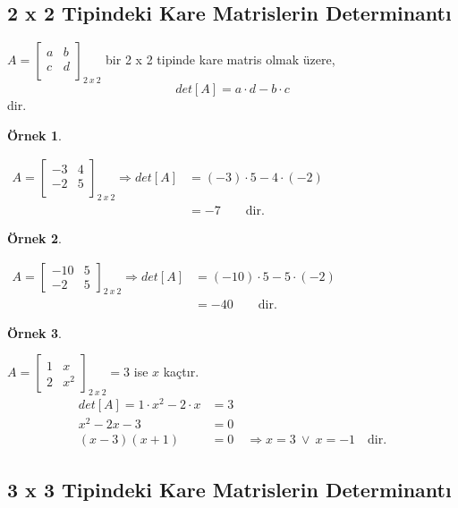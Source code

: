 \documentclass[a4paper,10pt]{book}
\theoremstyle{italik}
\newtheorem{ornek}{Örnek}[chapter]
\begin{document}
\subsection{2 x 2 Tipindeki Kare Matrislerin Determinantı}
$
A=\left[\begin{array}{cccc}
	a & b  \\
	c & d \\
\end{array}\right]_{2\ x\ 2}
$
bir 2 x 2 tipinde kare matris olmak üzere,
$$
det\left[A\right]=a\cdot d - b\cdot c
$$
dir.
\begin{ornek}
\end{ornek}
$
\begin{array}{ll}
	A=\left[\begin{array}{cccc}
		-3 & 4  \\
		-2 & 5 \\
	\end{array}\right]_{2\ x\ 2} \Rightarrow
	det\left[A\right]&=(-3)\cdot 5 - 4\cdot (-2) \\
	&=-7 \qquad \text{dir}.
\end{array}
$
\begin{ornek}
\end{ornek}
$
\begin{array}{ll}
	A=\left[\begin{array}{cccc}
		-10 & 5  \\
		-2 & 5 
	\end{array}\right]_{2\ x\ 2} \Rightarrow
	det\left[A\right]&=(-10)\cdot 5 - 5\cdot (-2) \\
	&=-40 \qquad \text{dir}.
\end{array}
$
\begin{ornek}
\end{ornek}
$
A=\left[\begin{array}{cccc}
	1 & x  \\
	2 & x^2 
\end{array}\right]_{2\ x\ 2}=3
$
ise $ x $ kaçtır.
\begin{align*}
	det[A]=1 \cdot x^2 - 2 \cdot x &= 3 \\
	x^2-2x-3 &=0 \\
	(x-3)(x+1)&=0 \quad \Rightarrow x=3\ \vee\ x=-1 \quad \text{dir.}
\end{align*}
\subsection{3 x 3 Tipindeki Kare Matrislerin Determinantı}
\end{document}
